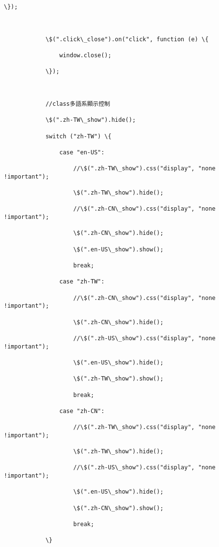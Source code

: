 \documentclass[11pt]{article}
\begin{document}
\begin{Verbatim}[commandchars=\\\{\}]
            \});



            \$(".click\_close").on("click", function (e) \{

                window.close();

            \});



            //class多語系顯示控制

            \$(".zh-TW\_show").hide();

            switch ("zh-TW") \{

                case "en-US":

                    //\$(".zh-TW\_show").css("display", "none !important");

                    \$(".zh-TW\_show").hide();

                    //\$(".zh-CN\_show").css("display", "none !important");

                    \$(".zh-CN\_show").hide();

                    \$(".en-US\_show").show();

                    break;

                case "zh-TW":

                    //\$(".zh-CN\_show").css("display", "none !important");

                    \$(".zh-CN\_show").hide();

                    //\$(".zh-US\_show").css("display", "none !important");

                    \$(".en-US\_show").hide();

                    \$(".zh-TW\_show").show();

                    break;

                case "zh-CN":

                    //\$(".zh-TW\_show").css("display", "none !important");

                    \$(".zh-TW\_show").hide();

                    //\$(".zh-US\_show").css("display", "none !important");

                    \$(".en-US\_show").hide();

                    \$(".zh-CN\_show").show();

                    break;

            \}




\end{Verbatim}
\end{document}
